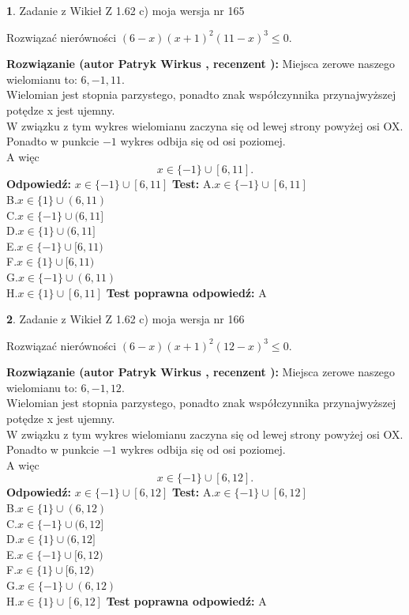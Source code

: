 \documentclass[12pt, a4paper]{article}
\theoremstyle{definition} %
\newtheorem{zad}{}
\newcommand{\zadStart}[1]{\begin{zad}#1\newline}
\newcommand{\zadStop}{\end{zad}}
\newcommand{\rozwStart}[2]{\noindent \textbf{Rozwiązanie (autor #1 , recenzent #2): }\newline}
\newcommand{\rozwStop}{\newline}
\newcommand{\odpStart}{\noindent \textbf{Odpowiedź:}\newline}
\newcommand{\odpStop}{\newline}
\newcommand{\testStart}{\noindent \textbf{Test:}\newline}
\newcommand{\testStop}{\newline}
\newcommand{\kluczStart}{\noindent \textbf{Test poprawna odpowiedź:}\newline}
\newcommand{\kluczStop}{\newline}
\begin{document}
\zadStart{Zadanie z Wikieł Z 1.62 c) moja wersja nr 165}

Rozwiązać nierówności $(6-x)(x+1)^{2}(11-x)^{3}\le0$.
\zadStop
\rozwStart{Patryk Wirkus}{}
Miejsca zerowe naszego wielomianu to: $6, -1, 11$.\\
Wielomian jest stopnia parzystego, ponadto znak współczynnika przy\linebreak najwyższej potędze x jest ujemny.\\ W związku z tym wykres wielomianu zaczyna się od lewej strony powyżej osi OX.\\
Ponadto w punkcie $-1$ wykres odbija się od osi poziomej.\\
A więc $$x \in \{-1\} \cup [6,11].$$
\rozwStop
\odpStart
$x \in \{-1\} \cup [6,11]$
\odpStop
\testStart
A.$x \in \{-1\} \cup [6,11]$\\
B.$x \in \{1\} \cup (6,11)$\\
C.$x \in \{-1\} \cup (6,11]$\\
D.$x \in \{1\} \cup (6,11]$\\
E.$x \in \{-1\} \cup [6,11)$\\
F.$x \in \{1\} \cup [6,11)$\\
G.$x \in \{-1\} \cup (6,11)$\\
H.$x \in \{1\} \cup [6,11]$
\testStop
\kluczStart
A
\kluczStop



\zadStart{Zadanie z Wikieł Z 1.62 c) moja wersja nr 166}

Rozwiązać nierówności $(6-x)(x+1)^{2}(12-x)^{3}\le0$.
\zadStop
\rozwStart{Patryk Wirkus}{}
Miejsca zerowe naszego wielomianu to: $6, -1, 12$.\\
Wielomian jest stopnia parzystego, ponadto znak współczynnika przy\linebreak najwyższej potędze x jest ujemny.\\ W związku z tym wykres wielomianu zaczyna się od lewej strony powyżej osi OX.\\
Ponadto w punkcie $-1$ wykres odbija się od osi poziomej.\\
A więc $$x \in \{-1\} \cup [6,12].$$
\rozwStop
\odpStart
$x \in \{-1\} \cup [6,12]$
\odpStop
\testStart
A.$x \in \{-1\} \cup [6,12]$\\
B.$x \in \{1\} \cup (6,12)$\\
C.$x \in \{-1\} \cup (6,12]$\\
D.$x \in \{1\} \cup (6,12]$\\
E.$x \in \{-1\} \cup [6,12)$\\
F.$x \in \{1\} \cup [6,12)$\\
G.$x \in \{-1\} \cup (6,12)$\\
H.$x \in \{1\} \cup [6,12]$
\testStop
\kluczStart
A
\kluczStop
\end{document}
